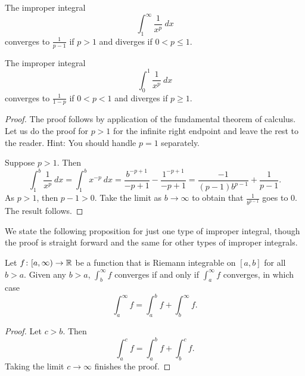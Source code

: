 \begin{prop}%
\label{impropriemann:ptest}
The improper integral
\begin{equation*}
\int_1^\infty \frac{1}{x^p} ~dx
\end{equation*}
converges to $\frac{1}{p-1}$ if $p > 1$ and diverges if $0 < p \leq 1$.

The improper integral
\begin{equation*}
\int_0^1 \frac{1}{x^p} ~dx
\end{equation*}
converges to $\frac{1}{1-p}$ if $0 < p < 1$ and diverges if $p \geq 1$.
\end{prop}

\begin{proof}
The proof follows by application of the fundamental theorem of calculus.
Let us do the proof for $p > 1$ for the infinite right endpoint and
leave the rest to the reader.  Hint: You should handle $p=1$
separately.

Suppose $p > 1$.  Then
\begin{equation*}
\int_1^b \frac{1}{x^p} ~dx
=
\int_1^b x^{-p} ~dx
=
\frac{b^{-p+1}}{-p+1}
-
\frac{1^{-p+1}}{-p+1}
=
\frac{-1}{(p-1)b^{p-1}}
+
\frac{1}{p-1} .
\end{equation*}
As $p > 1$, then $p-1 > 0$.  Take the limit as $b \to \infty$
to obtain that $\frac{1}{b^{p-1}}$ goes to 0.  The result follows.
\end{proof}

We state the following proposition for just one type
of improper integral, though the proof is straight
forward and the same for other types of improper integrals.

\begin{prop} \label{impropriemann:tail}
Let $f \colon [a,\infty) \to {\mathbb{R}}$ be a function
that is Riemann integrable on $[a,b]$ for all $b > a$.
Given any $b > a$,
$\int_b^\infty f$ converges if and only if $\int_a^\infty f$
converges, in which case
\begin{equation*}
\int_a^\infty f
=
\int_a^b f +
\int_b^\infty f .
\end{equation*}
\end{prop}

\begin{proof}
Let $c > b$.  Then
\begin{equation*}
\int_a^c f
=
\int_a^b f +
\int_b^c f .
\end{equation*}
Taking the limit $c \to \infty$ finishes the proof.
\end{proof}

